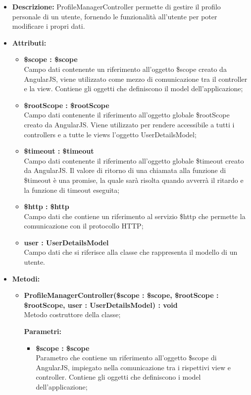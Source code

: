 \begin{itemize}
	\item \textbf{Descrizione:} ProfileManagerController permette di gestire il profilo personale di un
utente, fornendo le funzionalità all'utente per poter modificare i propri dati.
	\item \textbf{Attributi:}
		\begin{itemize}
		
			\item \textbf{\$scope : \$scope}\\
			Campo dati contenente un riferimento all'oggetto \$scope creato da AngularJS, viene utilizzato come mezzo di comunicazione tra il controller e la view. Contiene gli oggetti che definiscono il model dell'applicazione;
			
			\item \textbf{\$rootScope : \$rootScope}\\
			Campo dati contenente il riferimento all'oggetto globale \$rootScope creato da AngularJS. Viene utilizzato per rendere accessibile a tutti i controllers e a tutte le views l'oggetto UserDetailsModel;
				
			\item \textbf{\$timeout : \$timeout }\\
			Campo dati contenente il riferimento all'oggetto globale \$timeout creato da AngularJS. Il valore di ritorno di una chiamata alla funzione di \$timeout è una promise, la quale
sarà risolta quando avverrà il ritardo e la funzione di timeout eseguita;

			\item \textbf{\$http : \$http }\\
			Campo dati che contiene un riferimento al servizio \$http che permette la comunicazione con il protocollo HTTP;
				
			\item \textbf{user : UserDetailsModel }\\
			Campo dati che si riferisce alla classe che rappresenta il modello di un utente.
				
		\end{itemize}
	\item \textbf{Metodi:}
		\begin{itemize}
		
			\item \textbf{ProfileManagerController(\$scope : \$scope, \$rootScope : \$rootScope, user : UserDetailsModel) : void}\\
			Metodo costruttore della classe;
			\begin{description}
    			\item[\textbf{Parametri:}]
			\end{description}
			\begin{itemize}
				\item \textbf{\$scope : \$scope}\\
				Parametro che contiene un riferimento all'oggetto \$scope di AngularJS, impiegato nella comunicazione tra i rispettivi view e controller. Contiene gli oggetti che definiscono i model dell'applicazione;
				

\end{itemize}
\end{itemize}
\end{itemize}
